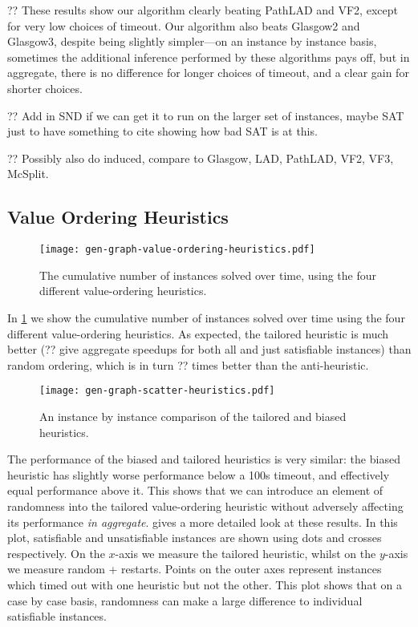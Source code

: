\documentclass{article}
\begin{document}
?? These results show our algorithm clearly beating PathLAD and VF2, except for very low choices of
timeout. Our algorithm also beats Glasgow2 and Glasgow3, despite being slightly simpler---on an
instance by instance basis, sometimes the additional inference performed by these algorithms pays
off, but in aggregate, there is no difference for longer choices of timeout, and a clear gain for
shorter choices.

?? Add in SND if we can get it to run on the larger set of instances, maybe SAT just to have
something to cite showing how bad SAT is at this.

?? Possibly also do induced, compare to Glasgow, LAD, PathLAD, VF2, VF3, McSplit.

\subsection{Value Ordering Heuristics}

\begin{figure}[tb]
    \centering
    \texttt{[image: gen-graph-value-ordering-heuristics.pdf]}

    \caption{The cumulative number of instances solved over time, using the four different
    value-ordering heuristics.}
    \label{figure:value-ordering-heuristics}
\end{figure}

In \cref{figure:value-ordering-heuristics} we show the cumulative number of instances solved over
time using the four different value-ordering heuristics. As expected, the tailored heuristic is much
better (?? give aggregate speedups for both all and just satisfiable instances) than random
ordering, which is in turn ?? times better than the anti-heuristic.

\begin{figure}[tb]
    \centering
    \texttt{[image: gen-graph-scatter-heuristics.pdf]}

    \caption{An instance by instance comparison of the tailored and biased heuristics.}
    \label{figure:scatter-heuristics}
\end{figure}

The performance of the biased and tailored heuristics is very similar: the biased heuristic has
slightly worse performance below a 100s timeout, and effectively equal performance above it. This
shows that we can introduce an element of randomness into the tailored value-ordering heuristic
without adversely affecting its performance \emph{in aggregate}. 
gives a more detailed look at these results. In this plot, satisfiable and unsatisfiable instances
are shown using dots and crosses respectively. On the $x$-axis we measure the tailored heuristic,
whilst on the $y$-axis we measure random + restarts. Points on the outer axes represent instances
which timed out with one heuristic but not the other. This plot shows that on a case by case basis,
randomness can make a large difference to individual satisfiable instances.
\end{document}
